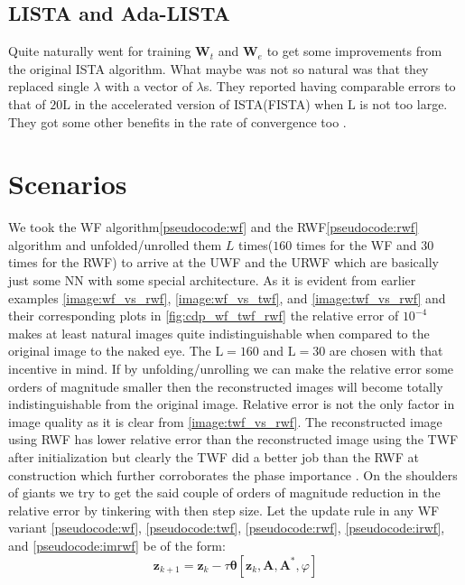 \subsection{LISTA and Ada-LISTA}

Quite naturally \cite{Gregor2010} went for training $\boldsymbol{W}_t$ and $\boldsymbol{W}_e$ to get some improvements 
from the original \ac{ISTA} algorithm. What maybe was not so natural was that they replaced single $\lambda$ with a vector of $\lambda$s. 
They reported having comparable errors to that of $20\mathrm{L}$ in the accelerated version of \ac{ISTA}(\ac{FISTA})
when $\mathrm{L}$ is not too large. They got some other benefits in the rate of convergence too \cite{Daubechies2003}\cite{Beck2009}\cite{Gregor2010}. 


\section{Scenarios}

We took the \ac{WF} algorithm\ref{pseudocode:wf} and the \ac{RWF}\ref{pseudocode:rwf} algorithm and unfolded/unrolled them $L$ times($160$ times for the \ac{WF} 
and $30$ times for the \ac{RWF}) to arrive at the \ac{UWF} and the \ac{URWF} which are basically just some \ac{NN} 
with some special architecture. As it is evident from earlier examples \cref{image:wf_vs_rwf}, \ref{image:wf_vs_twf}, 
and \ref{image:twf_vs_rwf} and their corresponding plots in \cref{fig:cdp_wf_twf_rwf} the relative error of $10^{-4}$ 
makes at least natural images quite indistinguishable when compared to the original image to the naked eye. The 
$\mathrm{L}=160$ and $\mathrm{L}=30$ are chosen with that incentive in mind. If by unfolding/unrolling we can make 
the relative error some orders of magnitude smaller then the reconstructed images will become totally 
indistinguishable from the original image. Relative error is not the only factor in image quality as it is clear 
from \cref{image:twf_vs_rwf}. The reconstructed image using \ac{RWF} has lower relative error than the 
reconstructed image using the \ac{TWF} after initialization but clearly the \ac{TWF} did a better job than the 
\ac{RWF} at construction which further corroborates the phase importance \cite{Oppenheim1979}\cite{Oppenheim1981}\cite{Shechtman2015}. 
On the shoulders of giants\cite{Gregor2010} we try to get the said couple of orders of magnitude reduction in the relative error by 
tinkering with then step size\cite{Gregor2010}. Let the update rule in any 
\ac{WF}\cite{Liu2019}\cite{Jaganathan2015} variant \cref{pseudocode:wf}, \ref{pseudocode:twf}, \ref{pseudocode:rwf}, \ref{pseudocode:irwf}, and \ref{pseudocode:imrwf} be of the form:
\begin{equation*}
  \boldsymbol{z}_{k+1} = \boldsymbol{z}_k - \tau\boldsymbol{\theta}[\boldsymbol{z}_k,\boldsymbol{A},\boldsymbol{A^*},\varphi]
\end{equation*}

